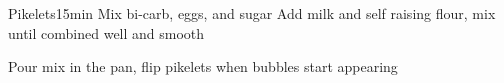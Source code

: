 \begin{recipe}{Pikelets}{}{15min}
Mix bi-carb, eggs, and sugar
Add milk and self raising flour, mix until combined well and smooth

Pour mix in the pan, flip pikelets when bubbles start appearing
\end{recipe}
